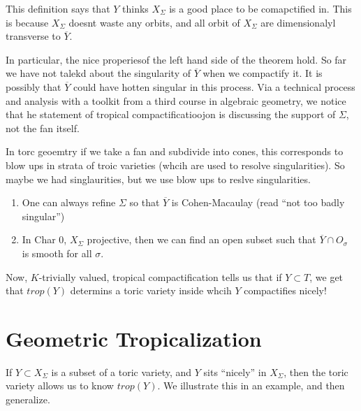\documentclass[11pt]{article}
\theoremstyle{definition}
\begin{document}
This definition says that $Y$ thinks $X_\Sigma$ is a good place to be comapctified in. This is because $X_\Sigma$ doesnt waste any orbits, and all orbit of $X_\Sigma$ are dimensionalyl transverse to $\overline{Y}$.


In particular, the nice properiesof the left hand side of the theorem hold. So far we have not talekd about the singularity of $\overline{Y}$ when we compactify it. It is possibly that $\overline{Y}$ could have hotten singular in this process. Via a technical process and analysis with a toolkit from a third course in algebraic geometry, we notice that he statement of tropical compactificatioojon is discussing the support of $\Sigma$, not the fan itself.


In torc geoemtry if we take a fan and subdivide into cones, this corresponds to blow ups in strata of troic varieties (whcih are used to resolve singularities). So maybe we had singlaurities, but we use blow ups to reslve singularities.

\begin{enumerate}
    \item One can always refine $\Sigma$ so that $\overline{Y}$ is Cohen-Macaulay (read ``not too badly singular'')
    \item In Char 0, $X_\Sigma$ projective, then we can find an open subset such that $\overline{Y} \cap O_\sigma$ is smooth for all $\sigma$.
\end{enumerate}






Now, $K$-trivially valued, tropical compactification tells us that if $Y \subset T$, we get that $trop(Y)$ determins a toric variety inside whcih $Y$ compactifies nicely!

\section{Geometric Tropicalization}

If $Y\subset X_\Sigma$ is  a subset of a toric variety, and $Y$ sits ``nicely'' in $X_\Sigma$, then the toric variety allows us to know $trop(Y)$. We illustrate this in an example, and then generalize.
\end{document}
